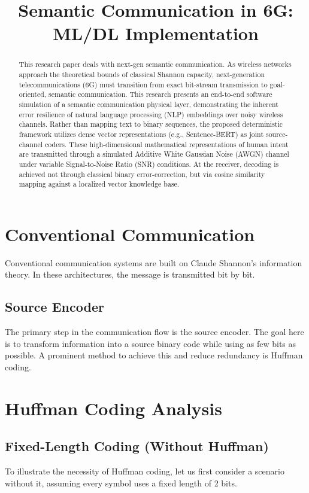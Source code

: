 \documentclass[10pt, conference]{IEEEtran}
\title{Semantic Communication in 6G: ML/DL Implementation}
\author{\IEEEauthorblockN{Arpit Raj}
\IEEEauthorblockA{\textit{The LNM Institute of Information Technology (LNMIIT)}\\
Jaipur, India}
}
\begin{document}
\maketitle

\begin{abstract}
This research paper deals with next-gen semantic communication. As wireless networks approach the theoretical bounds of classical Shannon capacity, next-generation telecommunications (6G) must transition from exact bit-stream transmission to goal-oriented, semantic communication. This research presents an end-to-end software simulation of a semantic communication physical layer, demonstrating the inherent error resilience of natural language processing (NLP) embeddings over noisy wireless channels. Rather than mapping text to binary sequences, the proposed deterministic framework utilizes dense vector representations (e.g., Sentence-BERT) as joint source-channel coders. These high-dimensional mathematical representations of human intent are transmitted through a simulated Additive White Gaussian Noise (AWGN) channel under variable Signal-to-Noise Ratio (SNR) conditions. At the receiver, decoding is achieved not through classical binary error-correction, but via cosine similarity mapping against a localized vector knowledge base.
\end{abstract}

\section{\large \textbf{Conventional Communication}}
Conventional communication systems are built on Claude Shannon's information theory. In these architectures, the message is transmitted bit by bit. 

\subsection{\textbf{Source Encoder}}
The primary step in the communication flow is the source encoder. The goal here is to transform information into a source binary code while using as few bits as possible. A prominent method to achieve this and reduce redundancy is Huffman coding.

\section{\large \textbf{Huffman Coding Analysis}}

\subsection{\textbf{Fixed-Length Coding (Without Huffman)}}
To illustrate the necessity of Huffman coding, let us first consider a scenario without it, assuming every symbol uses a fixed length of 2 bits.
\end{document}
